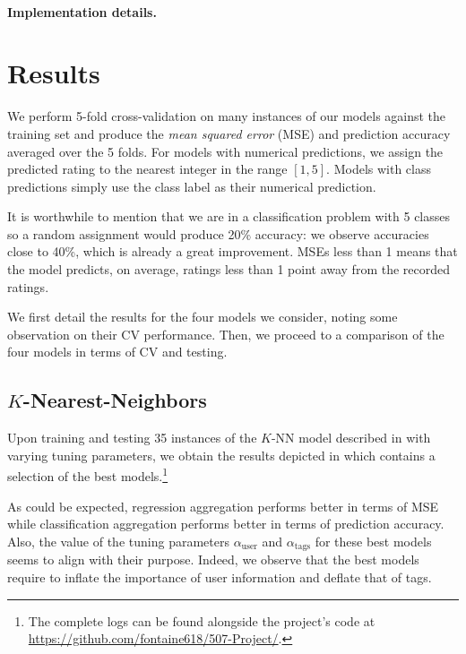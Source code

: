\documentclass[bj, preprint]{imsart}
\begin{document}
\paragraph{Implementation details.}\label{par:method.models.rbm.impl}





\section{Results}\label{sec:results}

We perform 5-fold cross-validation on many instances of our models against the training set and produce the \textit{mean squared error} (MSE) and prediction accuracy averaged over the 5 folds. For models with numerical predictions, we assign the predicted rating to the nearest integer in the range $[1,5]$.  Models with class predictions simply use the class label as their numerical prediction. 

It is worthwhile to mention that we are in a classification problem with 5 classes so a random assignment would produce 20\% accuracy: we observe accuracies close to 40\%, which is already a great improvement. MSEs less than 1 means that the model predicts, on average, ratings less than 1 point away from the recorded ratings.

We first detail the results for the four models we consider, noting some observation on their CV performance. Then, we proceed to a comparison of the four models in terms of CV and testing.

\subsection{$K$-Nearest-Neighbors}\label{sebsec:results.knn}

Upon training and testing 35 instances of the $K$-NN model described in  with varying tuning parameters, we obtain the results depicted in  which contains a selection of the best models.\footnote{The complete logs can be found alongside the project's code at \url{https://github.com/fontaine618/507-Project/}.} 

As could be expected, regression aggregation performs better in terms of MSE while classification aggregation performs better in terms of prediction accuracy. Also, the value of the tuning parameters $\alpha_\text{user}$ and $\alpha_\text{tags}$ for these best models seems to align with their purpose. Indeed, we observe that the best models require to inflate the importance of user information and deflate that of tags.
\end{document}
